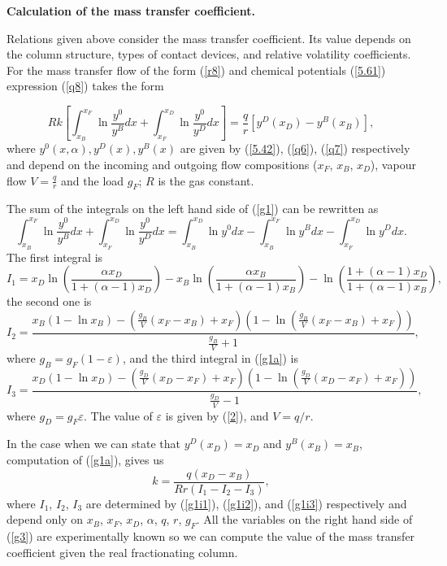 \documentclass[12pt]{article}
\begin{document}
\textbf{Calculation of the mass transfer coefficient.}

Relations given above consider the mass transfer coefficient. Its value depends on the column structure, types of contact devices, and relative volatility coefficients. For the mass transfer flow of the form (\ref{r8}) and chemical potentials (\ref{5.61}) expression (\ref{q8}) takes the form

\begin{equation}
Rk\left[\int^{x_F}_{x_B}\ln\frac{y^0}{y^B}dx+\int^{x_D}_{x_F}\ln\frac{y^0}{y^D}dx\right]=\frac{q}{r}[y^D(x_D)-y^B(x_B)],
\label{g1}
\end{equation}
where $y^0(x,\alpha), y^D(x), y^B(x)$ are given by (\ref{5.42}), (\ref{q6}), (\ref{q7}) respectively and depend on the incoming and outgoing flow compositions ($x_F$, $x_B$, $x_D$), vapour flow $V=\frac{q}{r}$ and the load $g_F$; $R$ is the gas constant.

The sum of the integrals on the left hand side of (\ref{g1}) can be rewritten as
\begin{equation}
\int^{x_F}_{x_B}\ln\frac{y^0}{y^B}dx+\int^{x_D}_{x_F}\ln\frac{y^0}{y^D}dx = \int^{x_D}_{x_B}\ln y^0 dx - \int^{x_F}_{x_B}\ln y^B dx - \int^{x_D}_{x_F} \ln y^D dx.
\label{g1a}
\end{equation}
The first integral is 
\begin{equation}
I_1 = x_D\ln\left(\frac{\alpha x_D}{1 + (\alpha - 1) x_D}\right) - x_B\ln\left(\frac{\alpha x_B}{1 + (\alpha - 1) x_B}\right) - \ln\left(\frac{1 + (\alpha - 1) x_D}{1 + (\alpha - 1) x_B}\right),
\label{g1i1}
\end{equation}
the second one is
\begin{equation}
I_2 = \frac{x_B(1-\ln x_B) - \left(\frac{g_B}{V}(x_F - x_B) + x_F\right)\left(1 - \ln\left(\frac{g_B}{V}(x_F-x_B)+ x_F\right)\right)}{\frac{g_B}{V}+1},
\label{g1i2}
\end{equation}
where $g_B = g_F(1 - \varepsilon)$, and the third integral in (\ref{g1a}) is
\begin{equation}
I_3 = \frac{x_D(1-\ln x_D) - \left(\frac{g_D}{V}(x_D - x_F) + x_F\right)\left(1-\ln\left(\frac{g_D}{V}(x_D-x_F) + x_F\right)\right)}{\frac{g_D}{V}-1},
\label{g1i3}
\end{equation}
where $g_D = g_F \varepsilon$. The value of $\varepsilon$ is given by (\ref{2}), and $V = q/r$.

In the case when we can state that $y^D(x_D)=x_D$ and $y^B(x_B)=x_B$, computation of (\ref{g1a}), gives us
\begin{equation}
k = \frac{q(x_D - x_B)}{Rr(I_1 - I_2 - I_3)},
\label{g3}
\end{equation}
where $I_1$, $I_2$, $I_3$ are determined by (\ref{g1i1}), (\ref{g1i2}), and (\ref{g1i3}) respectively and depend only on $x_B$, $x_F$, $x_D$, $\alpha$, $q$, $r$, $g_F$.
All the variables on the right hand side of (\ref{g3}) are experimentally known so we can compute the value of the mass transfer coefficient given the real fractionating column.
\end{document}
